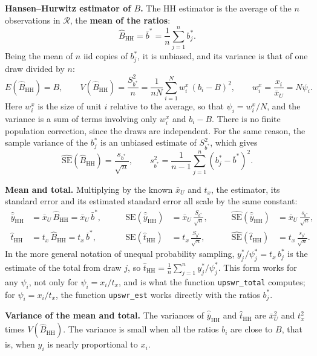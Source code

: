 \documentclass[
  letterpaper,
  DIV=11,
  numbers=noendperiod]{scrreprt}
\renewcommand{\[}{\begin{equation}}
\renewcommand{\]}{\end{equation}}
\begin{document}
\textbf{Hansen--Hurwitz estimator of \(B\).} The HH estimator is the
average of the \(n\) observations in \(\mathcal{R}\), the \textbf{mean
of the ratios}: \[
\boxed{\hat{B}_{\mathrm{HH}}=\bar{b}^*=\frac{1}{n}\sum_{j=1}^n b_j^*} .
\] Being the mean of \(n\) iid copies of \(b_j^*\), it is unbiased, and
its variance is that of one draw divided by \(n\): \[
E(\hat{B}_{\mathrm{HH}})=B,\qquad
V(\hat{B}_{\mathrm{HH}})=\frac{S_{b^*}^2}{n}=\frac{1}{nN}\sum_{i=1}^N w^x_i\,(b_i-B)^2 ,
\qquad w^x_i=\frac{x_i}{\bar{x}_U}=N\psi_i .
\] Here \(w^x_i\) is the size of unit \(i\) relative to the average, so
that \(\psi_i=w^x_i/N\), and the variance is a sum of terms involving
only \(w^x_i\) and \(b_i-B\). There is no finite population correction,
since the draws are independent. For the same reason, the sample
variance of the \(b_j^*\) is an unbiased estimate of \(S_{b^*}^2\),
which gives \[
\boxed{\widehat{\mathrm{SE}}(\hat{B}_{\mathrm{HH}})=\frac{s_{b^*}}{\sqrt{n}}},\qquad
s_{b^*}^2=\frac{1}{n-1}\sum_{j=1}^n\left(b_j^*-\bar{b}^*\right)^2 .
\]

\textbf{Mean and total.} Multiplying by the known \(\bar{x}_U\) and
\(t_x\), the estimator, its standard error and its estimated standard
error all scale by the same constant: \[
\boxed{\;
\begin{aligned}
\hat{\bar{y}}_{\mathrm{HH}}&=\bar{x}_U\,\hat{B}_{\mathrm{HH}}=\bar{x}_U\,\bar{b}^*,\qquad
&\mathrm{SE}(\hat{\bar{y}}_{\mathrm{HH}})&=\bar{x}_U\,\frac{S_{b^*}}{\sqrt{n}},\qquad
&\widehat{\mathrm{SE}}(\hat{\bar{y}}_{\mathrm{HH}})&=\bar{x}_U\,\frac{s_{b^*}}{\sqrt{n}},\\[4pt]
\hat{t}_{\mathrm{HH}}&=t_x\,\hat{B}_{\mathrm{HH}}=t_x\,\bar{b}^*,\qquad
&\mathrm{SE}(\hat{t}_{\mathrm{HH}})&=t_x\,\frac{S_{b^*}}{\sqrt{n}},\qquad
&\widehat{\mathrm{SE}}(\hat{t}_{\mathrm{HH}})&=t_x\,\frac{s_{b^*}}{\sqrt{n}} .
\end{aligned}\;}
\] In the more general notation of unequal probability sampling,
\(y_j^*/\psi_j^*=t_x\,b_j^*\) is the estimate of the total from draw
\(j\), so \(\hat{t}_{\mathrm{HH}}=\frac1n\sum_{j=1}^n y_j^*/\psi_j^*\).
This form works for any \(\psi_i\), not only for \(\psi_i=x_i/t_x\), and
is what the function \texttt{upswr\_total} computes; for
\(\psi_i=x_i/t_x\), the function \texttt{upswr\_est} works directly with
the ratios \(b_j^*\).

\textbf{Variance of the mean and total.} The variances of
\(\hat{\bar{y}}_{\mathrm{HH}}\) and \(\hat{t}_{\mathrm{HH}}\) are
\(\bar{x}_U^2\) and \(t_x^2\) times \(V(\hat{B}_{\mathrm{HH}})\). The
variance is small when all the ratios \(b_i\) are close to \(B\), that
is, when \(y_i\) is nearly proportional to \(x_i\).
\end{document}
